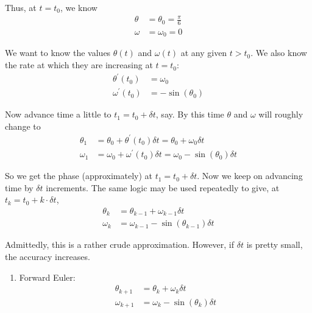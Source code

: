 \documentclass[a4paper,11pt]{report}
\begin{document}
\begin{enumerate}
    Thus, at $t = t_0$, we know
    \begin{equation*}
    \begin{aligned}
    \theta &= \theta_0 = \frac{\pi}{6} \\
    \omega &= \omega_0 = 0
    \end{aligned}
    \end{equation*}

    We want to know the values $\theta(t)$ and $\omega(t)$ at any given 
    $t > t_0$. We also know the rate at which they are increasing at $t = t_0$:
    \begin{equation*}
    \begin{aligned}
    \theta^{\prime}(t_0) &= \omega_0 \\
    \omega^{\prime}(t_0) &= - \sin(\theta_0)
    \end{aligned}
    \end{equation*}

    Now advance time a little to $t_1 = t_0 + \delta t$, say. By this time 
    $\theta$ and $\omega$ will roughly change to
    \begin{equation*}
    \begin{aligned}
    \theta_1 &= \theta_0 + \theta^{\prime}(t_0) \delta t = \theta_0 + 
    \omega_0 \delta t \\
    \omega_1 &= \omega_0 + \omega^{\prime}(t_0) \delta t = \omega_0 - 
    \sin(\theta_0) \delta t
    \end{aligned}
    \end{equation*}

    So we get the phase (approximately) at $t_1 = t_0 + \delta t$. Now we 
    keep on advancing time by $\delta t$ increments. The same logic may be 
    used repeatedly to give, at $t_k = t_0 + k \cdot \delta t$,
    \begin{equation*}
    \begin{aligned}
    \theta_k &= \theta_{k-1} + \omega_{k-1} \delta t \\
    \omega_k &= \omega_{k-1} - \sin(\theta_{k-1}) \delta t
    \end{aligned}
    \end{equation*}

    Admittedly, this is a rather crude approximation. However, if $\delta t$ 
    is pretty small, the accuracy increases.

    \begin{enumerate}

    \item Forward Euler:
    \begin{equation*}
    \begin{aligned}
    \theta_{k+1} &= \theta_{k} + \omega_{k} \delta t \\
    \omega_{k+1} &= \omega_{k} - \sin(\theta_{k}) \delta t
    \end{aligned}
    \end{equation*}


\end{enumerate}
\end{enumerate}
\end{document}
